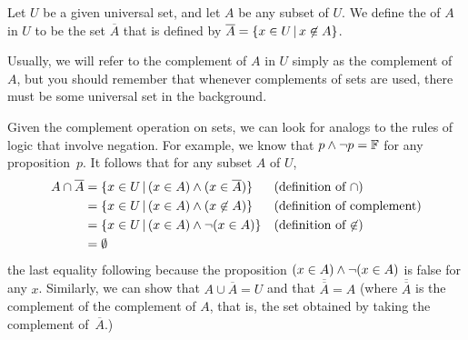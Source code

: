 \begin{definition}
Let $U$ be a given universal set, and let $A$ be any subset
of $U$.  We define the  of $A$ in $U$ to be the
set $\overline{A}$ that is defined by $\overline{A}=\{x\in U\,|\, x\not\in A\}$.
\end{definition}

Usually, we will refer to the complement of $A$ in $U$ simply as
the complement of $A$, but you should remember that whenever complements
of sets are used, there must be some universal set in the background.

Given the complement operation on sets, we can look for
analogs to the rules of logic that involve negation.
For example, we know that $p\wedge\lnot p=\mathbb{F}$ for any
proposition~$p$.  It follows that for any subset $A$ of $U$,
\begin{align*}
A\cap\overline{A} &= \{x\in U\,|\, (x\in A)\wedge (x\in \overline{A})\}
                        &&\text{(definition of $\cap$)}\\
                  &= \{x\in U\,|\, (x\in A)\wedge (x\not\in A)\}
                        &&\text{(definition of complement)}\\
                  &= \{x\in U\,|\, (x\in A)\wedge \lnot(x\in A)\}
                        &&\text{(definition of $\not\in$)}\\
                  &= \emptyset
\end{align*}
the last equality following because the proposition $(x\in A)\wedge \lnot(x\in A)$ is false for
any $x$.  Similarly, we can show that
$A\cup\overline{A}=U$ and that $\overline{\overline{A}}=A$
(where $\overline{\overline{A}}$ is the complement of the
complement of $A$, that is, the set obtained by taking the
complement of~$\overline{A}$.)

